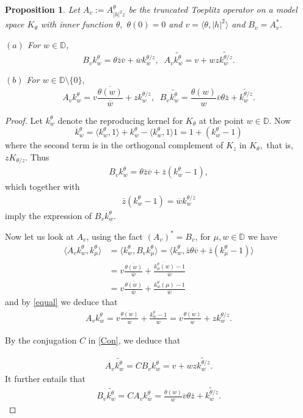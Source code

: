 \documentclass[12pt,reqno]{amsart}
\newtheorem{prop}[thm]{Proposition}
\theoremstyle{definition}
\theoremstyle{remark}
\numberwithin{equation}{section}
\newcommand{\la}{\langle}
\newcommand{\ra}{\rangle}
\newcommand{\ol}{\overline}
\begin{document}
\begin{prop}\label{prop ker} Let $A_v:=A_{|h|^2z}^\theta$ be the truncated Toeplitz operator on
a model space $K_\theta$ with  inner function $\theta,$ $\theta(0)=0$ and $v=\la \theta, |h|^2\ra$ and $B_v=A_v^*$.

 $(a)$ For $w\in \mathbb{D}$,
$$B_v k_{w}^\theta=
\theta\bar{z}\ol{v} +\ol{w}k_{w}^{\theta/z},\;\; A_v \widetilde{k_{w}^\theta}= v+ w z\widetilde{k_{w}^{\theta/z}}.$$

$(b)$ For $w\in \mathbb{D}\setminus\{0\},$ $$ A_v k_{w}^\theta =v   \frac{\ol{\theta(w)} }{\ol{w}} +zk_{w}^{\theta/z},\;\;
B_v \widetilde{k_{w}^\theta} =\frac{\theta(w)}{w}\ol{v}\theta\ol{z}+\widetilde{k_w^{\theta/z}}.$$
\end{prop}
\begin{proof}

Let $k_w^\theta$ denote the reproducing kernel for $K_\theta$ at the point $w\in \mathbb{D}$. Now $$k_w^\theta=\la k_w^\theta, 1\ra+k_w^\theta-\la k_w^\theta, 1\ra 1=1+(k_w^\theta-1)$$ where the second term is in the orthogonal complement of $K_z$ in $K_\theta,$ that is, $zK_{\theta/z}.$ Thus \begin{align*} B_vk_w^\theta=\theta\bar{z}\ol{v}+
\bar{z}(k_w^\theta-1),\end{align*} which together with
\begin{align}\bar{z}(k_w^\theta-1) = \ol{w}k_{w}^{\theta/z}\label{equal}\end{align} imply the expression of $B_vk_w^\theta.$

Now let us look at $A_v$, using the fact $(A_v)^*=B_v$, for $\mu, w\in \mathbb{D}$ we have
\begin{align*} \la A_v k_w^\theta, k_\mu^\theta\ra&= \la k_w^\theta, B_vk_\mu^\theta\ra= \la k_w^\theta, \bar{z}\theta\ol{v}+\bar{z}(k_\mu^\theta-1)\ra \\&=v\frac{\ol{\theta(w)}}{\ol{w}}+ \frac{\ol{k_\mu^\theta(w)}-1}{\ol{w}}\\&= v\frac{\ol{\theta(w)}}{\ol{w}}+\frac{k_w^\theta(\mu)-1}
{\ol{w}} \end{align*}
and  by \eqref{equal} we deduce that \begin{align*}A_v k_w^\theta= v \frac{\ol{\theta(w)}}{\ol{w}}+\frac{k_w^\theta-1}
{\ol{w}}=v\frac{\ol{\theta(w)}}{\ol{w}}+zk_w^{\theta/z}. \end{align*}

By the conjugation $C$ in \eqref{Con}, we deduce that

\begin{align*}A_v \widetilde{k_w^\theta}=C B_vk_w^\theta=v+wz\widetilde{k_w^{\theta/z}}. \end{align*}
It further entails that
\begin{align*} B_v\widetilde{k_w^\theta}=C A_v k_w^\theta=\frac{\theta(w)}{w}\ol{v}\theta \bar{z}+\widetilde{k_w^{\theta/z}}. \end{align*}
\end{proof}
\end{document}

